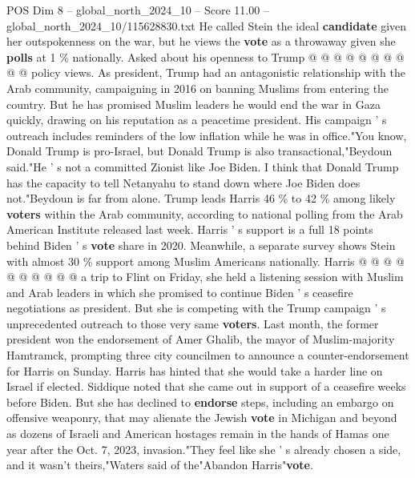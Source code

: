 \begin{textsample}{POS Dim 8 – global\_north\_2024\_10 – Score 11.00 – global\_north\_2024\_10/115628830.txt}
He called Stein the ideal \textbf{candidate} given her outspokenness on the war, but he views the \textbf{vote} as a throwaway given she \textbf{polls} at 1 \% nationally.
Asked about his openness to Trump @ @ @ @ @ @ @ @ @ @ policy views.
As president, Trump had an antagonistic relationship with the Arab community, campaigning in 2016 on banning Muslims from entering the country.
But he has promised Muslim leaders he would end the war in Gaza quickly, drawing on his reputation as a peacetime president.
His campaign ' s outreach includes reminders of the low inflation while he was in office."You know, Donald Trump is pro-Israel, but Donald Trump is also transactional,"Beydoun said."He ' s not a committed Zionist like Joe Biden.
I think that Donald Trump has the capacity to tell Netanyahu to stand down where Joe Biden does not."Beydoun is far from alone.
Trump leads Harris 46 \% to 42 \% among likely \textbf{voters} within the Arab community, according to national polling from the Arab American Institute released last week.
Harris ' s support is a full 18 points behind Biden ' s \textbf{vote} share in 2020.
Meanwhile, a separate survey shows Stein with almost 30 \% support among Muslim Americans nationally.
Harris @ @ @ @ @ @ @ @ @ @ a trip to Flint on Friday, she held a listening session with Muslim and Arab leaders in which she promised to continue Biden ' s ceasefire negotiations as president.
But she is competing with the Trump campaign ' s unprecedented outreach to those very same \textbf{voters}.
Last month, the former president won the endorsement of Amer Ghalib, the mayor of Muslim-majority Hamtramck, prompting three city councilmen to announce a counter-endorsement for Harris on Sunday.
Harris has hinted that she would take a harder line on Israel if elected.
Siddique noted that she came out in support of a ceasefire weeks before Biden.
But she has declined to \textbf{endorse} steps, including an embargo on offensive weaponry, that may alienate the Jewish \textbf{vote} in Michigan and beyond as dozens of Israeli and American hostages remain in the hands of Hamas one year after the Oct. 7, 2023, invasion."They feel like she ' s already chosen a side, and it wasn't theirs,"Waters said of the"Abandon Harris"\textbf{vote}.

\end{textsample}
